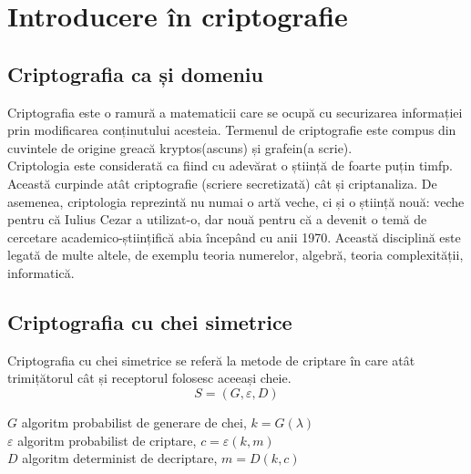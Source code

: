 \documentclass[12pt, oneside]{book}
\begin{document}
\chapter{Introducere în criptografie}

\section{Criptografia ca și domeniu \cite{cripto}}
Criptografia este o ramură a matematicii care se ocupă cu securizarea informației prin modificarea conținutului acesteia. Termenul de criptografie este compus din cuvintele de origine greacă kryptos(ascuns) și grafein(a scrie). \\
Criptologia este considerată ca fiind cu adevărat o știință de foarte puțin timfp. Această curpinde atât criptografie (scriere secretizată) cât și criptanaliza. De asemenea, criptologia reprezintă nu numai o artă veche, ci și o știință nouă: veche pentru că Iulius Cezar a utilizat-o, dar nouă pentru că a devenit o temă de cercetare academico-științifică abia începând cu anii 1970. Această disciplină este legată de multe altele, de exemplu teoria numerelor, algebră, teoria complexității, informatică.
\section{Criptografia cu chei simetrice}
Criptografia cu chei simetrice se referă la metode de criptare în care atât trimițătorul cât și receptorul folosesc aceeași cheie.\\
$$S=(G,\varepsilon,D)$$
{\center $G$ algoritm probabilist de generare de chei, $k = G(\lambda)$ \\
$\varepsilon$ algoritm probabilist de criptare, $c=\varepsilon(k,m)$\\
$D$ algoritm determinist de decriptare, $m=D(k,c)$

}
\end{document}

